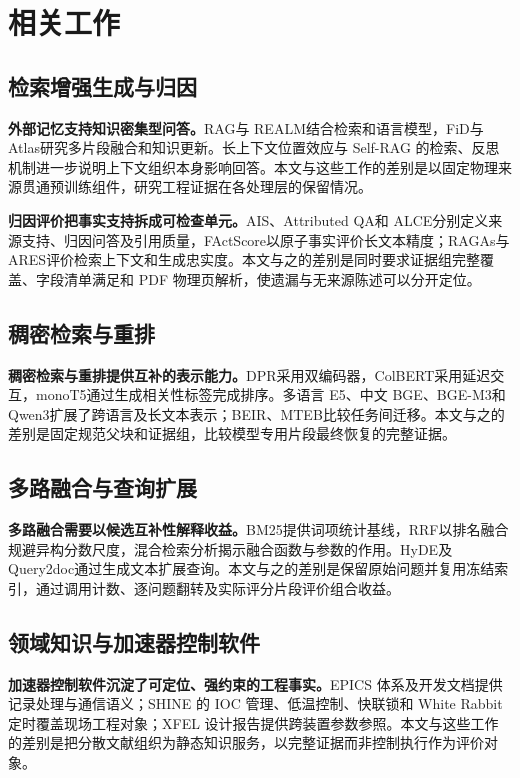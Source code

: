 \section{相关工作}

\subsection{检索增强生成与归因}
\textbf{外部记忆支持知识密集型问答。}RAG\citep{rag}与 REALM\citep{realm}结合检索和语言模型，FiD\citep{fid}与 Atlas\citep{atlas}研究多片段融合和知识更新。长上下文位置效应\citep{lostmiddle}与 Self-RAG 的检索、反思机制\citep{selfrag}进一步说明上下文组织本身影响回答。本文与这些工作的差别是以固定物理来源贯通预训练组件，研究工程证据在各处理层的保留情况。

\textbf{归因评价把事实支持拆成可检查单元。}AIS\citep{ais}、Attributed QA\citep{attributedqa}和 ALCE\citep{alce}分别定义来源支持、归因问答及引用质量，FActScore\citep{factscore}以原子事实评价长文本精度；RAGAs\citep{ragas}与 ARES\citep{ares}评价检索上下文和生成忠实度。本文与之的差别是同时要求证据组完整覆盖、字段清单满足和 PDF 物理页解析，使遗漏与无来源陈述可以分开定位。

\subsection{稠密检索与重排}
\textbf{稠密检索与重排提供互补的表示能力。}DPR\citep{dpr}采用双编码器，ColBERT\citep{colbert}采用延迟交互，monoT5\citep{monot5}通过生成相关性标签完成排序。多语言 E5\citep{e5}、中文 BGE\citep{bge}、BGE-M3\citep{bgem3}和 Qwen3\citep{qwen}扩展了跨语言及长文本表示；BEIR\citep{beir}、MTEB\citep{mteb}比较任务间迁移。本文与之的差别是固定规范父块和证据组，比较模型专用片段最终恢复的完整证据。

\subsection{多路融合与查询扩展}
\textbf{多路融合需要以候选互补性解释收益。}BM25\citep{bm25}提供词项统计基线，RRF\citep{rrf}以排名融合规避异构分数尺度，混合检索分析\citep{hybrid}揭示融合函数与参数的作用。HyDE\citep{hyde}及 Query2doc\citep{query2doc}通过生成文本扩展查询。本文与之的差别是保留原始问题并复用冻结索引，通过调用计数、逐问题翻转及实际评分片段评价组合收益。

\subsection{领域知识与加速器控制软件}
\textbf{加速器控制软件沉淀了可定位、强约束的工程事实。}EPICS 体系及开发文档\citep{epics,epicsdocs}提供记录处理与通信语义；SHINE 的 IOC 管理\citep{shineioc}、低温控制\citep{shinecryo}、快联锁\citep{shinefast}和 White Rabbit 定时\citep{shinetiming}覆盖现场工程对象；XFEL 设计报告\citep{xfel}提供跨装置参数参照。本文与这些工作的差别是把分散文献组织为静态知识服务，以完整证据而非控制执行作为评价对象。

